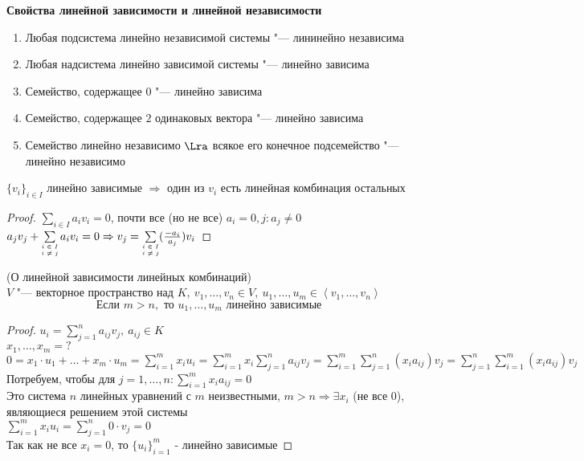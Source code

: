 \textbf{Свойства линейной зависимости и линейной независимости}

\begin{enumerate}
	\item
		Любая подсистема линейно независимой системы "--- лининейно независима
	\item
		Любая надсистема линейно зависимой системы "--- линейно зависима
	\item
		Семейство, содержащее $0$ "--- линейно зависима
	\item
		Семейство, содержащее $2$ одинаковых вектора "--- линейно зависима
	\item
		Семейство линейно независимо $\Lra$ всякое его конечное подсемейство "--- линейно независимо
\end{enumerate}

\begin{lemma}
	$\{ v_i \}_{i \in I}$ линейно зависимые $\Rightarrow$ один из $v_i$ есть линейная комбинация остальных
\end{lemma}
\begin{proof}
	$\sum\limits_{i \in I} a_iv_i = 0$, почти все (но не все) $a_i = 0, j \colon a_j \neq 0$ \\
	$a_jv_j + \sum\limits_{\substack{\text{\tiny{$i \in I $}} \\ \text{\tiny{$i \neq j $}}}} a_iv_i = 0 \Rightarrow v_j = \sum\limits_{\substack{\text{\tiny{$i \in I $}} \\ \text{\tiny{$i \neq j $}}}} (\frac{-a_i}{a_j})v_i$
\end{proof}

\begin{theorem}
	(О линейной зависимости линейных комбинаций) \\
	$V$ "--- векторное пространство над $K, ~ v_1, \dots, v_n \in V, ~ u_1, \dots, u_m \in \left< v_1, \dots, v_n \right>$ \\
	\[\text{Если } m > n, \text{ то } u_1, \dots, u_m \text{ линейно зависимые}\]
\end{theorem}
\begin{proof}
	$u_i = \sum\limits_{j = 1}^{n} a_{ij}v_j, ~ a_{ij} \in K$ \\
	$x_1, \dots, x_m = ?$ \\
	$0 = x_1 \cdot u_1 + \dots + x_m \cdot u_m = \sum\limits_{i = 1}^{m} x_iu_i = \sum\limits_{i = 1}^{m} x_i \sum\limits_{j = 1}^{n} a_{ij}v_j = \sum\limits_{i = 1}^{m} \sum\limits_{j = 1}^{n} (x_ia_{ij})v_j = \sum\limits_{j = 1}^{n} \sum\limits_{i = 1}^{m} (x_ia_{ij})v_j$ \\
	Потребуем, чтобы для $j = 1, \dots, n \colon \sum\limits_{i = 1}^{m} x_ia_{ij} = 0$ \\
	Это система $n$ линейных уравнений с $m$ неизвестными, $m > n \Rightarrow \exists x_i$ (не все $0$), являющиеся решением этой системы \\
	$\sum\limits_{i = 1}^{m} x_iu_i = \sum\limits_{j = 1}^{n} 0 \cdot v_j = 0$ \\
	Так как не все $x_i = 0$, то $\{u_i\}_{i = 1}^{m}$ - линейно зависимые
\end{proof}

